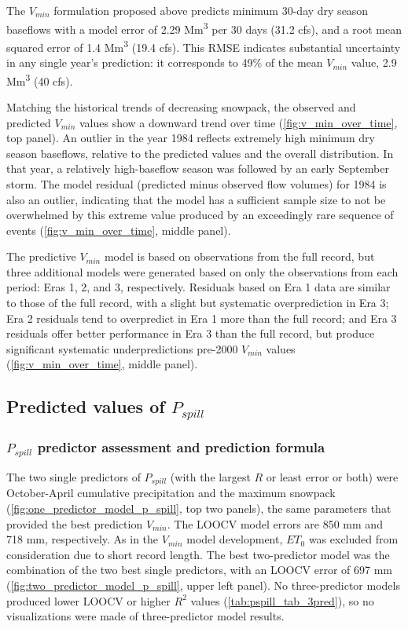 \documentclass[hess, manuscript]{copernicus}
\begin{document}
The \(V_{min}\) formulation proposed above predicts minimum 30-day dry
season baseflows with a model error of 2.29 Mm\textsuperscript{3} per 30
days (31.2 cfs), and a root mean squared error of 1.4
Mm\textsuperscript{3} (19.4 cfs). This RMSE indicates substantial
uncertainty in any single year's prediction: it corresponds to 49\% of
the mean \(V_{min}\) value, 2.9 Mm\textsuperscript{3} (40 cfs).

Matching the historical trends of decreasing snowpack, the observed and
predicted \(V_{min}\) values show a downward trend over time
(\autoref{fig:v_min_over_time}, top panel). An outlier in the year 1984
reflects extremely high minimum dry season baseflows, relative to the
predicted values and the overall distribution. In that year, a
relatively high-baseflow season was followed by an early September
storm. The model residual (predicted minus observed flow volumes) for
1984 is also an outlier, indicating that the model has a sufficient
sample size to not be overwhelmed by this extreme value produced by an
exceedingly rare sequence of events (\autoref{fig:v_min_over_time},
middle panel).

The predictive \(V_{min}\) model is based on observations from the full
record, but three additional models were generated based on only the
observations from each period: Eras 1, 2, and 3, respectively. Residuals
based on Era 1 data are similar to those of the full record, with a
slight but systematic overprediction in Era 3; Era 2 residuals tend to
overpredict in Era 1 more than the full record; and Era 3 residuals
offer better performance in Era 3 than the full record, but produce
significant systematic underpredictions pre-2000 \(V_{min}\) values
(\autoref{fig:v_min_over_time}, middle panel).

\subsection{\texorpdfstring{Predicted values of
\(P_{spill}\)}{Predicted values of P\_\{spill\}}}

\subsubsection{\texorpdfstring{\(P_{spill}\) predictor assessment and
prediction
formula}{P\_\{spill\} predictor assessment and prediction formula}}

The two single predictors of \(P_{spill}\) (with the largest \(R\) or
least error or both) were October-April cumulative precipitation and the
maximum snowpack (\autoref{fig:one_predictor_model_p_spill}, top two
panels), the same parameters that provided the best prediction
\(V_{min}\). The LOOCV model errors are 850 mm and 718 mm, respectively.
As in the \(V_{min}\) model development, \(ET_{0}\) was excluded from
consideration due to short record length. The best two-predictor model
was the combination of the two best single predictors, with an LOOCV
error of 697 mm (\autoref{fig:two_predictor_model_p_spill}, upper left
panel). No three-predictor models produced lower LOOCV or higher \(R^2\)
values (\autoref{tab:pspill_tab_3pred}), so no visualizations were made
of three-predictor model results.
\end{document}
